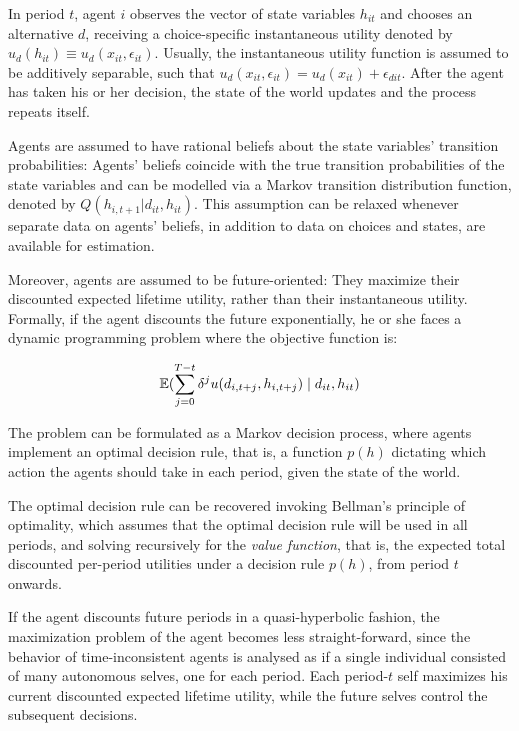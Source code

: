 In period $t$, agent $i$ observes the vector of state variables $h_{it}$ and chooses an alternative $d$, receiving a choice-specific instantaneous utility denoted by $u_d(h_{it}) \equiv u_d(x_{it}, \epsilon_{it})$. Usually, the instantaneous utility function is assumed to be additively separable, such that $u_d(x_{it}, \epsilon_{it}) = u_d(x_{it}) + \epsilon_{dit}$. After the agent has taken his or her decision, the state of the world updates and the process repeats itself.

Agents are assumed to have rational beliefs about the state variables' transition probabilities: Agents' beliefs coincide with the true transition probabilities of the state variables and can be modelled via a Markov transition distribution function, denoted by $Q(h_{i, t+1} | d_{it}, h_{it})$. This assumption can be relaxed whenever separate data on agents' beliefs, in addition to data on choices and states, are available for estimation.

Moreover, agents are assumed to be future-oriented: They maximize their discounted expected lifetime utility, rather than their instantaneous utility. Formally, if the agent discounts the future exponentially, he or she faces a dynamic programming problem where the objective function is:

\begin{equation} \label{eq:objective_function_exp}
\mathbb{E}(\sum^{T-t}_{j=0}\delta^ju(d_{i, t+j}, h_{i, t+j}) \mid d_{it}, h_{it}) \\
\end{equation}

The problem can be formulated as a Markov decision process, where agents implement an optimal decision rule, that is, a function $p(h)$ dictating which action the agents should take in each period, given the state of the world. 

The optimal decision rule can be recovered invoking Bellman's principle of optimality, which assumes that the optimal decision rule will be used in all periods, and solving recursively for the \textit{value function}, that is, the expected total discounted per-period utilities under a decision rule $p(h)$, from period $t$ onwards. 

If the agent discounts future periods in a quasi-hyperbolic fashion, the maximization problem of the agent becomes less straight-forward, since the behavior of time-inconsistent agents is analysed as if a single individual consisted of many autonomous selves, one for each period. Each period-$t$ self maximizes his current discounted expected lifetime utility, while the future selves control the subsequent decisions. 

